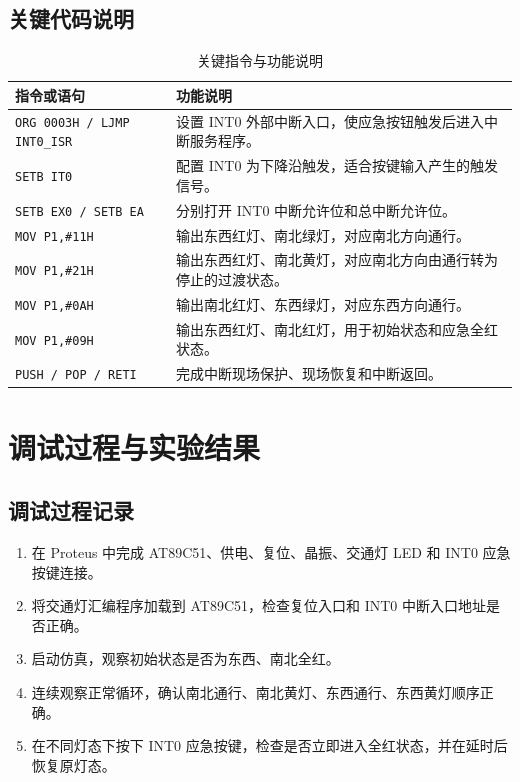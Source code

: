 \subsection{关键代码说明}
\begin{table}[H]
  \centering
  \caption{关键指令与功能说明}
  \renewcommand{\arraystretch}{1.35}
  \begin{tabular}{p{}p{}}
    \toprule
    指令或语句 & 功能说明 \\
    \midrule
    \texttt{ORG 0003H / LJMP INT0\_ISR} & 设置 INT0 外部中断入口，使应急按钮触发后进入中断服务程序。 \\
    \texttt{SETB IT0} & 配置 INT0 为下降沿触发，适合按键输入产生的触发信号。 \\
    \texttt{SETB EX0 / SETB EA} & 分别打开 INT0 中断允许位和总中断允许位。 \\
    \texttt{MOV P1,\#11H} & 输出东西红灯、南北绿灯，对应南北方向通行。 \\
    \texttt{MOV P1,\#21H} & 输出东西红灯、南北黄灯，对应南北方向由通行转为停止的过渡状态。 \\
    \texttt{MOV P1,\#0AH} & 输出南北红灯、东西绿灯，对应东西方向通行。 \\
    \texttt{MOV P1,\#09H} & 输出东西红灯、南北红灯，用于初始状态和应急全红状态。 \\
    \texttt{PUSH / POP / RETI} & 完成中断现场保护、现场恢复和中断返回。 \\
    \bottomrule
  \end{tabular}
\end{table}

\section{调试过程与实验结果}

\subsection{调试过程记录}
\begin{enumerate}
  \item 在 Proteus 中完成 AT89C51、供电、复位、晶振、交通灯 LED 和 INT0 应急按键连接。
  \item 将交通灯汇编程序加载到 AT89C51，检查复位入口和 INT0 中断入口地址是否正确。
  \item 启动仿真，观察初始状态是否为东西、南北全红。
  \item 连续观察正常循环，确认南北通行、南北黄灯、东西通行、东西黄灯顺序正确。
  \item 在不同灯态下按下 INT0 应急按键，检查是否立即进入全红状态，并在延时后恢复原灯态。
\end{enumerate}

